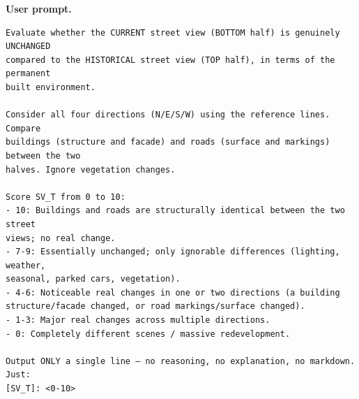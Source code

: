\noindent\textbf{User prompt.}\par
\begingroup\fontsize{8}{10}\selectfont
\begin{promptbox}
\begin{verbatim}
Evaluate whether the CURRENT street view (BOTTOM half) is genuinely UNCHANGED
compared to the HISTORICAL street view (TOP half), in terms of the permanent
built environment.

Consider all four directions (N/E/S/W) using the reference lines. Compare
buildings (structure and facade) and roads (surface and markings) between the two
halves. Ignore vegetation changes.

Score SV_T from 0 to 10:
- 10: Buildings and roads are structurally identical between the two street
views; no real change.
- 7-9: Essentially unchanged; only ignorable differences (lighting, weather,
seasonal, parked cars, vegetation).
- 4-6: Noticeable real changes in one or two directions (a building
structure/facade changed, or road markings/surface changed).
- 1-3: Major real changes across multiple directions.
- 0: Completely different scenes / massive redevelopment.

Output ONLY a single line — no reasoning, no explanation, no markdown. Just:
[SV_T]: <0-10>
\end{verbatim}
\end{promptbox}
\endgroup

